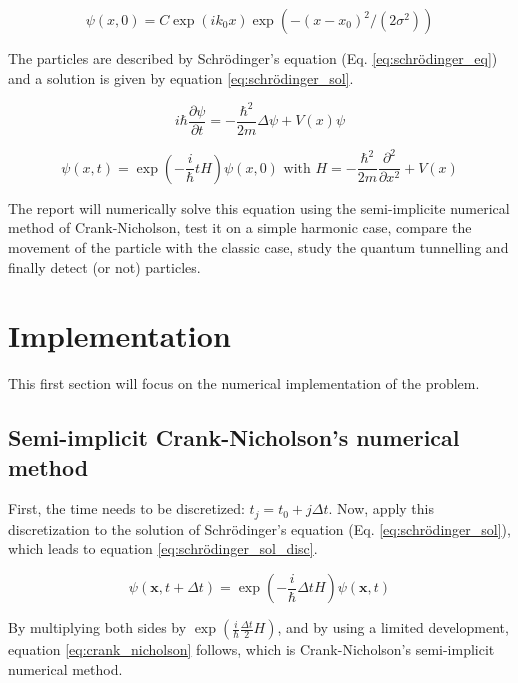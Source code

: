 \documentclass[a4paper,12pt,twoside]{article}
\newcommand{\mbf}[1]{\mathbf{#1}} %
\newcommand{\bracket}[1]{\left(#1\right)}
\newcommand{\lapl}[1]{\Delta#1}
\begin{document}
  \begin{equation}
    \psi(x,0) = C\exp(ik_0x)\exp(-(x-x_0)^2/(2\sigma^2))
    \label{eq:wave_packet}
  \end{equation}

  The particles are described by Schrödinger's equation (Eq. \eqref{eq:schrödinger_eq}) and a solution is given by equation \eqref{eq:schrödinger_sol}.

  \begin{equation}
    i\hbar\frac{\partial\psi}{\partial t} = -\frac{\hbar^2}{2m}\lapl{\psi} + V(x)\psi
    \label{eq:schrödinger_eq}
  \end{equation}

  \begin{equation}
    \psi(x,t) = \exp\bracket{-\frac{i}{\hbar}tH}\psi(x,0)\text{ with }H=-\frac{\hbar^2}{2m}\frac{\partial^2}{\partial x^2} + V(x)
    \label{eq:schrödinger_sol}
  \end{equation}

  The report will numerically solve this equation using the semi-implicite numerical method of Crank-Nicholson, test it on a simple harmonic case, compare the movement of the particle with the classic case, study the quantum tunnelling and finally detect (or not) particles.

\newpage
\section{Implementation}\label{sec:impl}
  This first section will focus on the numerical implementation of the problem.

  \subsection{Semi-implicit Crank-Nicholson's numerical method}
    First, the time needs to be discretized: $t_j = t_0 + j\Delta t$.
    Now, apply this discretization to the solution of Schrödinger's equation (Eq. \eqref{eq:schrödinger_sol}), which leads to equation \eqref{eq:schrödinger_sol_disc}.

    \begin{equation}
      \psi(\mbf{x}, t + \Delta t) = \exp\bracket{-\frac{i}{\hbar}\Delta t H}\psi(\mbf{x}, t)
      \label{eq:schrödinger_sol_disc}
    \end{equation}

    By multiplying both sides by $\exp\bracket{\frac{i}{\hbar}\frac{\Delta t}{2}H}$, and by using a limited development, equation \eqref{eq:crank_nicholson} follows, which is Crank-Nicholson's semi-implicit numerical method.
\end{document}
